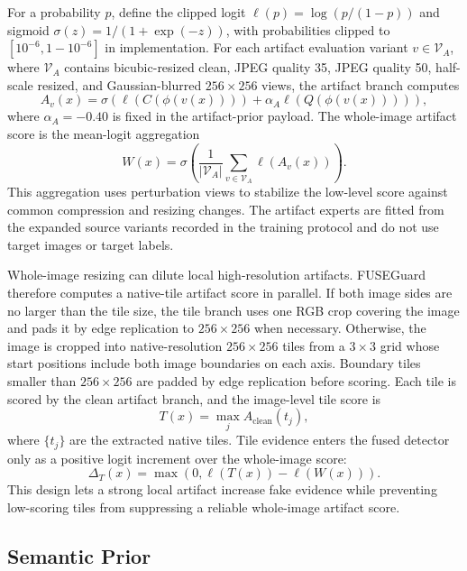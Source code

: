 \documentclass[lettersize,journal]{IEEEtran}
\begin{document}
For a probability $p$, define the clipped logit $\ell(p)=\log(p/(1-p))$ and sigmoid $\sigma(z)=1/(1+\exp(-z))$, with probabilities clipped to $[10^{-6},1-10^{-6}]$ in implementation. For each artifact evaluation variant $v \in \mathcal{V}_{A}$, where $\mathcal{V}_{A}$ contains bicubic-resized clean, JPEG quality 35, JPEG quality 50, half-scale resized, and Gaussian-blurred $256 \times 256$ views, the artifact branch computes
\[
    A_v(x)=\sigma\left(\ell(C(\phi(v(x))))+\alpha_A \ell(Q(\phi(v(x))))\right),
\]
where $\alpha_A=-0.40$ is fixed in the artifact-prior payload. The whole-image artifact score is the mean-logit aggregation
\[
    W(x)=\sigma\left(\frac{1}{|\mathcal{V}_{A}|}\sum_{v\in\mathcal{V}_{A}}\ell(A_v(x))\right).
\]
This aggregation uses perturbation views to stabilize the low-level score against common compression and resizing changes. The artifact experts are fitted from the expanded source variants recorded in the training protocol and do not use target images or target labels.

Whole-image resizing can dilute local high-resolution artifacts. FUSEGuard therefore computes a native-tile artifact score in parallel. If both image sides are no larger than the tile size, the tile branch uses one RGB crop covering the image and pads it by edge replication to $256 \times 256$ when necessary. Otherwise, the image is cropped into native-resolution $256 \times 256$ tiles from a $3 \times 3$ grid whose start positions include both image boundaries on each axis. Boundary tiles smaller than $256 \times 256$ are padded by edge replication before scoring. Each tile is scored by the clean artifact branch, and the image-level tile score is
\[
    T(x)=\max_{j} A_{\mathrm{clean}}(t_j),
\]
where $\{t_j\}$ are the extracted native tiles. Tile evidence enters the fused detector only as a positive logit increment over the whole-image score:
\[
    \Delta_T(x)=\max\left(0,\ell(T(x))-\ell(W(x))\right).
\]
This design lets a strong local artifact increase fake evidence while preventing low-scoring tiles from suppressing a reliable whole-image artifact score.

\subsection{Semantic Prior}
\label{sec:method_semantic}
\end{document}
